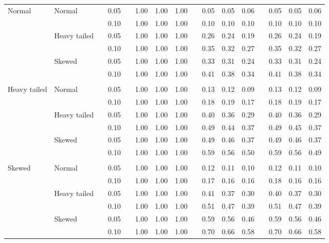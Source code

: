 \begin{table}[ht]
\begin{scriptsize}
\begin{center}
\begin{tabular}{ll p{.1cm} c p{.1cm} rrr p{.1cm} rrr p{.1cm} rrr}
\rowcolor{gray!20} Normal       & Normal       && 0.05 &&   1.00 & 1.00 & 1.00 && 0.05 & 0.05 & 0.06 && 0.05 & 0.05 & 0.06 \\ 
\rowcolor{gray!20}             &              && 0.10 &&   1.00 & 1.00 & 1.00 && 0.10 & 0.10 & 0.10 && 0.10 & 0.10 & 0.10 \\ 
\rowcolor{gray!20}             & Heavy tailed && 0.05 &&   1.00 & 1.00 & 1.00 && 0.26 & 0.24 & 0.19 && 0.26 & 0.24 & 0.19 \\ 
\rowcolor{gray!20}             &              && 0.10 &&   1.00 & 1.00 & 1.00 && 0.35 & 0.32 & 0.27 && 0.35 & 0.32 & 0.27 \\ 
\rowcolor{gray!20}             & Skewed       && 0.05 &&   1.00 & 1.00 & 1.00 && 0.33 & 0.31 & 0.24 && 0.33 & 0.31 & 0.24 \\ 
\rowcolor{gray!20}             &              && 0.10 &&   1.00 & 1.00 & 1.00 && 0.41 & 0.38 & 0.34 && 0.41 & 0.38 & 0.34 \\ 
             &&&&&&&&&&&&&&&\\
Heavy tailed & Normal       && 0.05 &&   1.00 & 1.00 & 1.00 && 0.13 & 0.12 & 0.09 && 0.13 & 0.12 & 0.09 \\ 
             &              && 0.10 &&   1.00 & 1.00 & 1.00 && 0.18 & 0.19 & 0.17 && 0.18 & 0.19 & 0.17 \\ 
             & Heavy tailed && 0.05 &&   1.00 & 1.00 & 1.00 && 0.40 & 0.36 & 0.29 && 0.40 & 0.36 & 0.29 \\ 
             &              && 0.10 &&   1.00 & 1.00 & 1.00 && 0.49 & 0.44 & 0.37 && 0.49 & 0.45 & 0.37 \\ 
             & Skewed       && 0.05 &&   1.00 & 1.00 & 1.00 && 0.49 & 0.46 & 0.37 && 0.49 & 0.46 & 0.37 \\ 
             &              && 0.10 &&   1.00 & 1.00 & 1.00 && 0.59 & 0.56 & 0.50 && 0.59 & 0.56 & 0.49 \\
             &&&&&&&&&&&&&&&\\ 
Skewed       & Normal       && 0.05 &&   1.00 & 1.00 & 1.00 && 0.12 & 0.11 & 0.10 && 0.12 & 0.11 & 0.10 \\ 
             &              && 0.10 &&   1.00 & 1.00 & 1.00 && 0.17 & 0.16 & 0.16 && 0.18 & 0.16 & 0.16 \\ 
             & Heavy tailed && 0.05 &&   1.00 & 1.00 & 1.00 && 0.41 & 0.37 & 0.30 && 0.40 & 0.37 & 0.30 \\ 
             &              && 0.10 &&   1.00 & 1.00 & 1.00 && 0.51 & 0.47 & 0.39 && 0.51 & 0.47 & 0.39 \\ 
             & Skewed       && 0.05 &&   1.00 & 1.00 & 1.00 && 0.59 & 0.56 & 0.46 && 0.59 & 0.56 & 0.46 \\ 
             &              && 0.10 &&   1.00 & 1.00 & 1.00 && 0.70 & 0.66 & 0.58 && 0.70 & 0.66 & 0.58 \\ 


\end{tabular}
\end{center}
\end{scriptsize}
\end{table}
